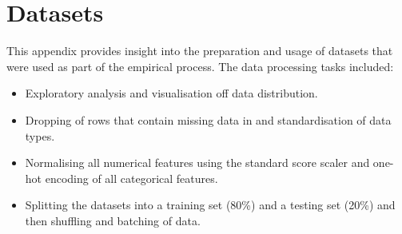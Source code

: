 \chapter{Datasets}
\label{app:datasets}

This appendix provides insight into the preparation and usage of datasets that were used as part of the empirical process. The data processing tasks included:

\begin{itemize}
	\item Exploratory analysis and visualisation off data distribution.

	\item Dropping of rows that contain missing data in and standardisation of data types.

	\item Normalising all numerical features using the standard score scaler and one-hot encoding of all categorical features.

	\item Splitting the datasets into a training set (80\%) and a testing set (20\%) and then shuffling and batching of data.
\end{itemize}
